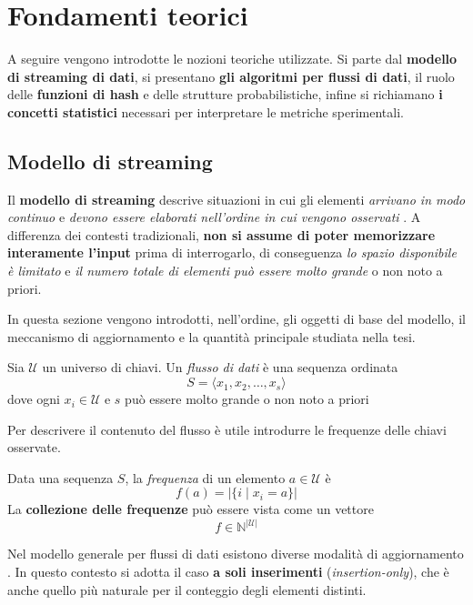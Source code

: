 
\chapter{Fondamenti teorici}
\label{chp:background}
A seguire vengono introdotte le nozioni teoriche utilizzate.
Si parte dal \textbf{modello di streaming di dati}, si presentano \textbf{gli algoritmi per flussi di dati},
il ruolo delle \textbf{funzioni di hash} e delle strutture probabilistiche, 
infine si richiamano \textbf{i concetti statistici} necessari per interpretare le metriche sperimentali.

\section{Modello di streaming}
Il \textbf{modello di streaming} descrive situazioni in cui gli elementi \textit{arrivano in modo continuo}
e \textit{devono essere elaborati nell'ordine in cui vengono osservati} \cite{Leskovec_Rajaraman_Ullman_2014}.
A differenza dei contesti tradizionali, \textbf{non si assume di poter memorizzare interamente l'input}
prima di interrogarlo, di conseguenza \textit{lo spazio disponibile è limitato} e \textit{il numero totale di elementi
può essere molto grande} o non noto a priori.

In questa sezione vengono introdotti, nell'ordine, gli oggetti di base del modello,
il meccanismo di aggiornamento e la quantità principale studiata nella tesi.

\begin{definition}
Sia $\mathcal{U}$ un universo di chiavi. Un \emph{flusso di dati} è una sequenza ordinata
\[
S = \langle x_1, x_2, \dots, x_s \rangle
\]
dove ogni $x_i \in \mathcal{U}$ e $s$ può essere molto grande o non noto a priori
\end{definition}

Per descrivere il contenuto del flusso è utile introdurre le frequenze delle chiavi osservate.

\begin{definition}[Frequenze]
Data una sequenza $S$, la \emph{frequenza} di un elemento $a \in \mathcal{U}$ è
\[
f(a) = |\{i \mid x_i = a\}|
\]
La \textbf{collezione delle frequenze} può essere vista come un vettore
\[
f \in \mathbb{N}^{|\mathcal{U}|}
\]
\end{definition}

Nel modello generale per flussi di dati esistono diverse modalità di aggiornamento
\cite{Muthukrishnan_2005}. In questo contesto si adotta il caso \textbf{a soli inserimenti}
(\emph{insertion-only}), che è anche quello più naturale per il conteggio degli elementi distinti.

